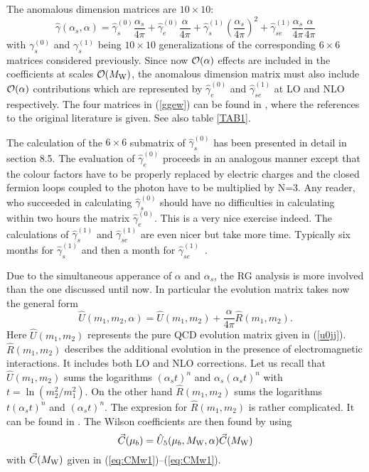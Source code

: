 \documentclass[12pt,rotate]{article}
\def\as{\alpha_s}
\newcommand{\mw}{M_{\rm W}}
\newcommand{\be}{\begin{equation}}
\newcommand{\ee}{\end{equation}}
\newcommand{\ord}{{\cal O}}
\def\aspi{\frac{\as}{4\pi}}
\begin{document}
\begin{itemize}
\begin{itemize}
The anomalous dimension matrices are $10\times 10$:
\begin{equation}\label{ggew}
\hat\gamma(\as,\alpha)=\hat\gamma_s^{(0)}\aspi + 
\hat\gamma_e^{(0)}\frac{\alpha}{4\pi}+ 
\hat\gamma_s^{(1)}\left(\aspi\right)^2+
\hat\gamma_{se}^{(1)}\aspi\frac{\alpha}{4\pi}
\end{equation}
with $\gamma_s^{(0)}$ and $\gamma_s^{(1)}$ being $10\times 10$
generalizations of the corresponding $6\times 6$ matrices considered
previously. Since now $\ord(\alpha)$ effects are included in the
coefficients at scales $\ord(\mw)$, the anomalous dimension matrix
must also include $\ord(\alpha)$ contributions which are represented
by $\hat\gamma_e^{(0)}$ and $\hat\gamma_{se}^{(1)}$ at LO and NLO
respectively. The four matrices in (\ref{ggew}) can be found in 
\cite{BBL}, where the references to the original literature is
given. See also table \ref{TAB1}.

The calculation of the $6\times 6$ submatrix of
$\hat\gamma_s^{(0)}$ has been presented in detail in section 8.5.
The evaluation of $\hat\gamma_e^{(0)}$ proceeds in an analogous
manner except that the colour factors have to be properly replaced
by electric charges and the closed fermion loops coupled to
the photon have to be multiplied by N=3. Any reader, who succeeded
in calculating
$\hat\gamma_s^{(0)}$ should have no difficulties in calculating
within two hours the matrix
$\hat\gamma_e^{(0)}$. This is a very nice exercise
indeed. 
The calculations of $\hat\gamma_s^{(1)}$ and $\hat\gamma_{se}^{(1)}$ 
are even nicer but take more time. Typically six months for
$\hat\gamma_s^{(1)}$ and then a month for
$\hat\gamma_{se}^{(1)}$~.

Due to the simultaneous apperance of $\alpha$ and $\alpha_s$, the
RG analysis is more involved than the one discussed until now. In
particular the evolution matrix takes now the general form
\be
\hat U(m_1,m_2,\alpha)=\hat U(m_1,m_2)+\frac{\alpha}{4\pi} \hat R(m_1,m_2).
\ee
Here $\hat U(m_1,m_2)$ represents the pure QCD evolution matrix given
in (\ref{u0jj}). $\hat R(m_1,m_2)$ describes the additional evolution
in the presence of electromagnetic interactions. 
It includes both LO and NLO corrections.
Let us recall that
$\hat U(m_1,m_2)$ sums the logarithms $(\as t)^n$ and $\as(\as t)^n$
with $t=\ln(m_2^2/m_1^2)$. On the other hand $\hat R(m_1,m_2)$ sums
the logarithms $t(\as t)^n$ and $(\as t)^n$. The expresion for
$\hat R(m_1,m_2)$ is rather complicated. It can be found in 
\cite{BBL,BJLW}.
The Wilson coefficients are then found by using
\be
\vec C(\mu_b)=\hat U_5(\mu_b,\mw,\alpha)\vec C(\mw)
\ee
with $\vec C(\mw)$ given in (\ref{eq:CMw1})--(\ref{eq:CMw1}).

\end{itemize}
\end{itemize}
\end{document}
